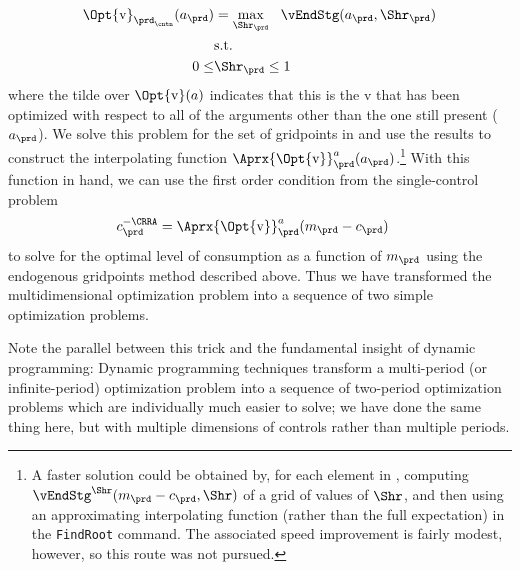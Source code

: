 \documentclass[titlepage, headings=optiontotocandhead]{econtex}
\begin{document}
\begin{equation}\begin{gathered}\begin{aligned}
      \Opt{\mathrm{v}}_{{\prd_\cntn}}(a_{\prd})  & = \max_{\Shr_{\prd}} ~~  \vEndStg(a_{\prd},\Shr_{\prd})
      \\      & \text{s.t.} \nonumber
      \\      0 \leq & \Shr_{\prd} \leq 1
    \end{aligned}\end{gathered}\end{equation}
where the tilde over $\Opt{\mathrm{v}}(a)$ indicates that this is the $\mathrm{v}$ that has been optimized with respect to all of the arguments other than the one still present ($a_{\prd}$).  We solve this problem for the set of gridpoints in  and use the results to construct the interpolating function $\Aprx{\Opt{\mathrm{v}}}_{\prd}^{a}(a_{\prd})$.\footnote{A faster solution could be obtained by, for each element in , computing $\vEndStg^{\Shr}(m_{\prd}-c_{\prd},\Shr)$ of a grid of values of $\Shr$, and then using an approximating interpolating function (rather than the full expectation) in the \texttt{FindRoot} command.  The associated speed improvement is fairly modest, however, so this route was not pursued.}  With this function in hand, we can use the first order condition from the single-control problem
\begin{equation*}\begin{gathered}\begin{aligned}
      c_{\prd}^{-\CRRA}  & = \Aprx{\Opt{\mathrm{v}}}_{\prd}^{a}(m_{\prd}-c_{\prd})
    \end{aligned}\end{gathered}\end{equation*}
to solve for the optimal level of consumption as a function of $m_{\prd}$ using the endogenous gridpoints method described above.  Thus we have transformed the multidimensional optimization problem into a sequence of two simple optimization problems.

Note the parallel between this trick and the fundamental insight of dynamic programming: Dynamic programming techniques transform a multi-period (or infinite-period) optimization problem into a sequence of two-period optimization problems which are individually much easier to solve; we have done the same thing here, but with multiple dimensions of controls rather than multiple periods.

\hypertarget{implementation}{}
\end{document}
